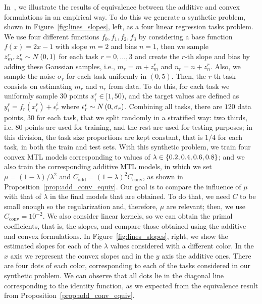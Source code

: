 In~\citep{RuizAD19}, we illustrate the results of equivalence between the additive and convex formulations in an empirical way. To do this we generate a synthetic problem, shown in Figure~\ref{fig:lines_slopes}, left, as a four linear regression tasks problem. 
%
We use four different functions $f_0, f_1, f_2, f_3$ by considering a base function $f(x) = 2x - 1$ with slope $m=2$ and bias $n=1$, then we sample $z_m^r, z_n^r \sim N \left(0, 1\right)$ for each task $r=0, \ldots, 3$ and create the $r$-th slope and bias by adding these Gaussian samples, i.e., $m_r = m + z_m^r$ and $n_r = n + z_n^r$. Also, we sample the noise $\sigma_r$ for each task uniformly in $(0, 5)$. 
%
Then, the $r$-th task consists on estimating $m_r$ and $n_r$ from data. To do this, for each task we uniformly sample $30$ points $x_i^r \in [1, 50)$, and the target values are defined as $y_i^r = f_r(x_i^r) + \epsilon^i_r$ where $\epsilon^i_r \sim N \left(0, \sigma_r\right)$.
%
Combining all tasks, there are $120$ data points, $30$ for each task, that we split randomly in a stratified way: two thirds, i.e. $80$ points are used for training, and the rest are used for testing purposes; in this division, the task size proportions are kept constant, that is $1/4$ for each task, in both the train and test sets. 
%
With this synthetic problem, we train four convex MTL models corresponding to values of $\lambda \in \left\{0.2, 0.4, 0.6, 0.8\right\}$; and we also train the corresponding additive MTL models, in which we set $\mu = (1 - \lambda)/\lambda^2$ and $C_\text{add} = (1 - \lambda)^2 C_\text{conv}$, as shown in Proposition~\ref{prop:add_conv_equiv}.
%
Our goal is to compare the influence of $\mu$ with that of $\lambda$ in the final models that are obtained. To do that, we need $C$ to be small enough so the regularization and, therefore, $\mu$ are relevant; then, we use $C_{\text{conv}} = 10^{-2}$. We also consider linear kernels, so we can obtain the primal coefficients, that is, the slopes, and compare those obtained using the additive and convex formulations. In Figure~\ref{fig:lines_slopes}, right, we show the estimated slopes for each of the $\lambda$ values considered with a different color. In the $x$ axis we represent the convex slopes and in the $y$ axis the additive ones. There are four dots of each color, corresponding to each of the tasks considered in our synthetic problem. We can observe that all dots lie in the diagonal line corresponding to the identity function, as we expected from the equivalence result from Proposition~\ref{prop:add_conv_equiv}.

